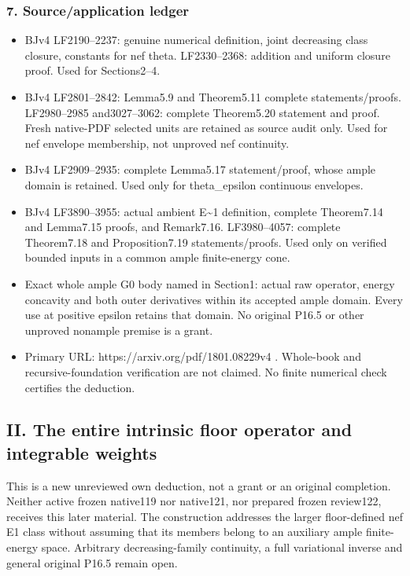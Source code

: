 \documentclass[
  10pt,
]{article}
\providecommand{\tightlist}{%
  \setlength{\itemsep}{0pt}\setlength{\parskip}{0pt}}
\begin{document}
\subsubsection{7. Source/application
ledger}\label{sourceapplication-ledger}

\begin{itemize}
\tightlist
\item
  BJv4 LF2190--2237: genuine numerical definition, joint decreasing
  class closure, constants for nef theta. LF2330--2368: addition and
  uniform closure proof. Used for Sections2--4.
\item
  BJv4 LF2801--2842: Lemma5.9 and Theorem5.11 complete
  statements/proofs. LF2980--2985 and3027--3062: complete Theorem5.20
  statement and proof. Fresh native-PDF selected units are retained as
  source audit only. Used for nef envelope membership, not unproved nef
  continuity.
\item
  BJv4 LF2909--2935: complete Lemma5.17 statement/proof, whose ample
  domain is retained. Used only for theta\_epsilon continuous envelopes.
\item
  BJv4 LF3890--3955: actual ambient E\textasciitilde1 definition,
  complete Theorem7.14 and Lemma7.15 proofs, and Remark7.16.
  LF3980--4057: complete Theorem7.18 and Proposition7.19
  statements/proofs. Used only on verified bounded inputs in a common
  ample finite-energy cone.
\item
  Exact whole ample G0 body named in Section1: actual raw operator,
  energy concavity and both outer derivatives within its accepted ample
  domain. Every use at positive epsilon retains that domain. No original
  P16.5 or other unproved nonample premise is a grant.
\item
  Primary URL: https://arxiv.org/pdf/1801.08229v4 . Whole-book and
  recursive-foundation verification are not claimed. No finite numerical
  check certifies the deduction.
\end{itemize}

\subsection{II. The entire intrinsic floor operator and integrable
weights}\label{ii.-the-entire-intrinsic-floor-operator-and-integrable-weights}

This is a new unreviewed own deduction, not a grant or an original
completion. Neither active frozen native119 nor native121, nor prepared
frozen review122, receives this later material. The construction
addresses the larger floor-defined nef E1 class without assuming that
its members belong to an auxiliary ample finite-energy space. Arbitrary
decreasing-family continuity, a full variational inverse and general
original P16.5 remain open.
\end{document}
